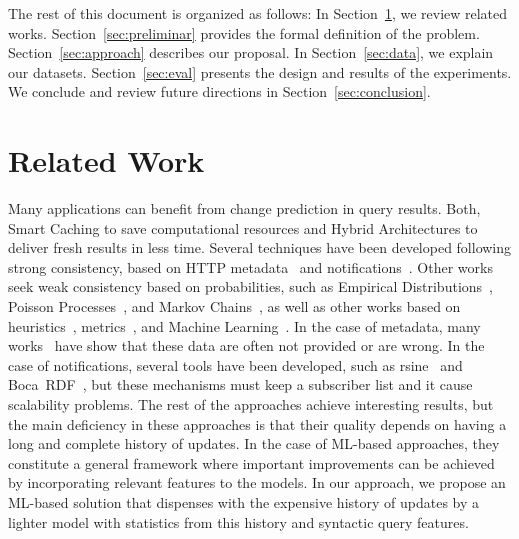 \documentclass[runningheads]{llncs}
\begin{document}
The rest of this document is organized as follows: In Section~\ref{sec:related}, we review related works. Section~\ref{sec:preliminar} provides the formal definition of the problem. Section~\ref{sec:approach} describes our proposal. In Section~\ref{sec:data}, we explain our datasets. Section~\ref{sec:eval} presents the design and results of the experiments. We conclude and review future directions in Section~\ref{sec:conclusion}.

%
\section{Related Work}
\label{sec:related}
%

Many applications can benefit from change prediction in query results. Both, Smart Caching to save computational resources and Hybrid Architectures to deliver fresh results in less time. Several techniques have been developed following strong consistency, based on HTTP metadata~\cite{fielding2rfc} and notifications~\cite{PassantM10,Fitzpatrick10,TrampFEA10}. Other works seek weak consistency based on probabilities, such as Empirical Distributions~\cite{NeumaierU16}, Poisson Processes~\cite{UmbrichHHPD10}, and Markov Chains~\cite{UmbrichMP15}, as well as other works based on heuristics~\cite{AliciAOCU12,UmbrichMP15,KnuthHS16}, metrics~\cite{DividinoGS15,KnuthHS16,AkhtarAL17}, and Machine Learning~\cite{NishiokaS17,GonzalezH18}. In the case of metadata, many works~\cite{UmbrichHHPD10,DividinoKG14,Kjernsmo15,NeumaierU16} have show that these data are often not provided or are wrong. In the case of notifications, several tools have been developed, such as rsine~\cite{MaderMS14} and Boca~RDF~\cite{MissierACDG07}, but these mechanisms must keep a subscriber list and it cause scalability problems. The rest of the approaches achieve interesting results, but the main deficiency in these approaches is that their quality depends on having a long and complete history of updates. In the case of ML-based approaches, they constitute a general framework where important improvements can be achieved by incorporating relevant features to the models. In our approach, we propose an ML-based solution that dispenses with the expensive history of updates by a lighter model with statistics from this history and syntactic query features.
\end{document}
